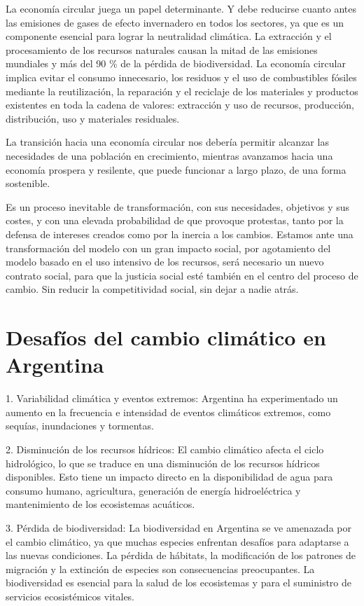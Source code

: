 \documentclass[runningheads]{llncs}
\begin{document}
La economía circular juega un papel determinante. Y debe reducirse cuanto antes las emisiones de gases de efecto invernadero en todos los sectores, ya que es un componente esencial para lograr la neutralidad climática. La extracción y el procesamiento de los recursos naturales causan la mitad de las emisiones mundiales y más del 90 \% de la pérdida de biodiversidad. La economía circular implica evitar el consumo innecesario, los residuos y el uso de combustibles fósiles mediante la reutilización, la reparación y el reciclaje de los materiales y productos existentes en toda la cadena de valores: extracción y uso de recursos, producción, distribución, uso y materiales residuales. 

La transición hacia una economía circular nos debería permitir alcanzar las necesidades de una población en crecimiento, mientras avanzamos hacia una economía prospera y resilente, que puede funcionar a largo plazo, de una forma sostenible.

Es un proceso inevitable de transformación, con sus necesidades, objetivos y sus costes, y con una elevada probabilidad de que provoque protestas, tanto por la defensa de intereses creados como por la inercia a los cambios. Estamos ante una transformación del modelo con un gran impacto social, por agotamiento del modelo basado en el uso intensivo de los recursos, será necesario un nuevo contrato social, para que la justicia social esté también en el centro del proceso de cambio. Sin reducir la competitividad social, sin dejar a nadie atrás.

\section{Desafíos del cambio climático en Argentina}


\hspace{0.5cm} 1. Variabilidad climática y eventos extremos: Argentina ha experimentado un aumento en la frecuencia e intensidad de eventos climáticos extremos, como sequías, inundaciones y tormentas.


2. Disminución de los recursos hídricos: El cambio climático afecta el ciclo hidrológico, lo que se traduce en una disminución de los recursos hídricos disponibles. Esto tiene un impacto directo en la disponibilidad de agua para consumo humano, agricultura, generación de energía hidroeléctrica y mantenimiento de los ecosistemas acuáticos.


3. Pérdida de biodiversidad: La biodiversidad en Argentina se ve amenazada por el cambio climático, ya que muchas especies enfrentan desafíos para adaptarse a las nuevas condiciones. La pérdida de hábitats, la modificación de los patrones de migración y la extinción de especies son consecuencias preocupantes. La biodiversidad es esencial para la salud de los ecosistemas y para el suministro de servicios ecosistémicos vitales.
\end{document}
